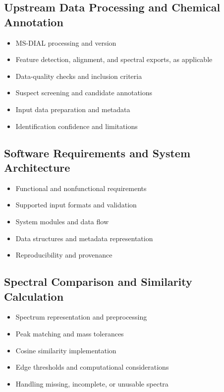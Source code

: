 \documentclass[11pt]{article}
\begin{document}
\begin{doublespace}
    \subsection{Upstream Data Processing and Chemical Annotation}
        \begin{itemize}
            \item MS-DIAL processing and version
            \item Feature detection, alignment, and spectral exports, as applicable
            \item Data-quality checks and inclusion criteria
            \item Suspect screening and candidate annotations
            \item Input data preparation and metadata
            \item Identification confidence and limitations
        \end{itemize}

    \subsection{Software Requirements and System Architecture}
        \begin{itemize}
            \item Functional and nonfunctional requirements
            \item Supported input formats and validation
            \item System modules and data flow
            \item Data structures and metadata representation
            \item Reproducibility and provenance
        \end{itemize}

    \subsection{Spectral Comparison and Similarity Calculation}
        \begin{itemize}
            \item Spectrum representation and preprocessing
            \item Peak matching and mass tolerances
            \item Cosine similarity implementation
            \item Edge thresholds and computational considerations
            \item Handling missing, incomplete, or unusable spectra
        \end{itemize}


\end{doublespace}
\end{document}
